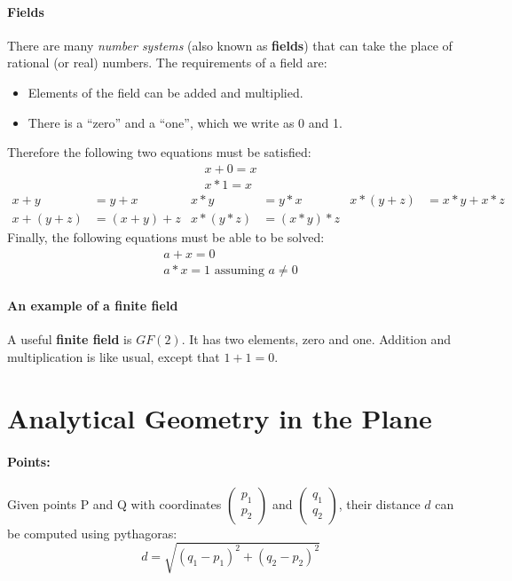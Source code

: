 \documentclass{article}
\begin{document}
\paragraph{Fields}
There are many \textit{number systems} (also known as \textbf{fields}) that can take the place of rational (or real) numbers. The requirements of a field are:
\begin{itemize}
\item Elements of the field can be added and multiplied.
\item There is a ``zero'' and a ``one'', which we write as 0 and 1.
\end{itemize}
Therefore the following two equations must be satisfied:
\begin{gather*}
x+0=x\\
x*1=x
\end{gather*}
\begin{align*}
x+y&=y+x & x*y&=y*x & x*(y+z)&=x*y+x*z\\
x+(y+z)&=(x+y)+z & x*(y*z)&=(x*y)*z
\end{align*}
Finally, the following equations must be able to be solved:
\begin{gather*}
a + x = 0\\
a*x=1 \text{ assuming } a\neq 0
\end{gather*}

\paragraph{An example of a finite field}
A useful \textbf{finite field} is $GF(2)$. It has two elements, zero and one. Addition and multiplication is like usual, except that $1+1=0$.

\section{Analytical Geometry in the Plane}

\paragraph{Points:}
Given points P and Q with coordinates
$\begin{pmatrix}p_1 \\ p_2\end{pmatrix}$
and
$\begin{pmatrix}q_1 \\ q_2\end{pmatrix}$,
their distance $d$ can be computed using pythagoras:
$$d = \sqrt{(q_1-p_1)^2+(q_2-p_2)^2}$$
\end{document}
